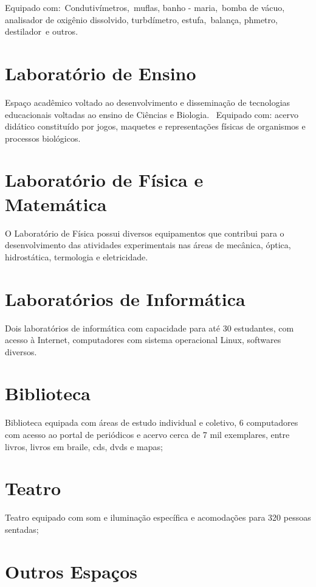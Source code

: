 \documentclass[11pt,fleqn]{book} %
\begin{document}
Equipado com: Condutivímetros, muflas, banho - maria, bomba de vácuo, analisador de oxigênio dissolvido, turbdímetro, estufa, balança, phmetro, destilador e outros.

\section{Laboratório de Ensino}

Espaço acadêmico voltado ao desenvolvimento e disseminação de tecnologias educacionais voltadas ao ensino de Ciências e Biologia.  Equipado com: acervo didático constituído por jogos, maquetes e representações físicas de organismos e processos biológicos.

\section{Laboratório de Física e Matemática}

O Laboratório de Física possui diversos equipamentos que contribui para o desenvolvimento das atividades experimentais nas áreas de mecânica, óptica, hidrostática, termologia e eletricidade.


\section{Laboratórios de Informática}

Dois laboratórios de informática com capacidade para até 30 estudantes, com acesso à Internet, computadores com sistema operacional Linux, softwares diversos.


\section{Biblioteca}

Biblioteca equipada com áreas de estudo individual e coletivo, 6 computadores com acesso ao portal de periódicos e acervo cerca de 7 mil exemplares, entre livros, livros em braile, cds, dvds e mapas;

\section{Teatro}

Teatro equipado com som e iluminação específica e acomodações para 320 pessoas sentadas;

\section{Outros Espaços}
\end{document}
